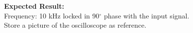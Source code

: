 \begin{figure}[H]
	\centering
\end{figure}

\textbf{Expected Result:}\\
Frequency: 10 kHz locked in 90$^\circ$ phase with the input signal.\\
Store a picture of the oscilloscope as reference.


